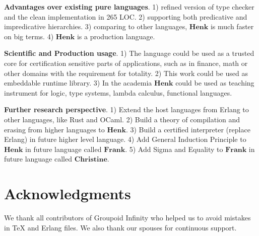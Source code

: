 \documentclass{article}
\begin{document}
{\bf Advantages over existing pure languages}.
1) refined version of type checker and the clean implementation in 265 LOC.
2) supporting both predicative and impredicative hierarchies.
3) comparing to other languages, $\mathbf{Henk}$ is much faster on big terms.
4) $\mathbf{Henk}$ is a production language.

{\bf Scientific and Production usage}.
1) The language could be used as a trusted core for certification sensitive parts of applications, such as in finance, math or other domains with the requirement for totality.
2) This work could be used as embeddable runtime library.
3) In the academia $\mathbf{Henk}$ could be used as teaching instrument for logic, type systems, lambda calculus, functional languages.

{\bf Further research perspective}.
1) Extend the host languages from Erlang to other languages, like Rust and OCaml.
2) Build a theory of compilation and erasing from higher languages to $\mathbf{Henk}$.
3) Build a certified interpreter (replace Erlang) in future higher level language.
4) Add General Induction Principle to $\mathbf{Henk}$ in future language called $\mathbf{Frank}$.
5) Add Sigma and Equality to $\mathbf{Frank}$ in future language called $\mathbf{Christine}$.

\section{Acknowledgments}
We thank all contributors of Groupoid Infinity who helped us to avoid mistakes in TeX and Erlang files.
We also thank our spouses for continuous support.
\end{document}
